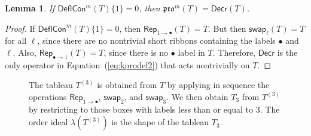 \documentclass[12pt]{amsart}
\newtheorem{lemma}[theorem]{Lemma}
\theoremstyle{definition}
\theoremstyle{remark}
\numberwithin{equation}{section}
\newcommand{\pro}{\mathfrak{pro}}
\newcommand{\swap}{\ensuremath{\mathsf{swap}}}
\newcommand{\decr}{\ensuremath{\mathsf{Decr}}}
\newcommand{\rep}{\ensuremath{\mathsf{Rep}}}
\newcommand{\compress}{\ensuremath{\mathsf{DeflCon}}}
\begin{document}
\begin{lemma}\label{lem:no_ones}
If $\compress^m(T)\lbrace 1 \rbrace = 0$, then $\pro^m(T) = \decr(T)$. 
\end{lemma} 
\begin{proof}
If $\compress^m(T)\lbrace 1 \rbrace = 0$, then $\rep_{1 \rightarrow \bullet}(T) = T$. But then $\swap_\ell(T) = T$ for all $\ell$, since there are no nontrivial short ribbons containing the labels $\bullet$ and $\ell$. Also, $\rep_{\bullet \rightarrow 1}(T) = T$, since there is no $\bullet$ label in $T$. Therefore, $\decr$ is the only operator in Equation~(\ref{eq:kprodef2}) that acts nontrivially on $T$. 
\end{proof}

\begin{figure}[h]
\caption{The tableau $T^{(3)}$ is obtained from $T$ by applying in sequence the operations 
$\rep_{1 \rightarrow \bullet}$, $\swap_2$, and $\swap_3$. 
We then obtain $T_3$ from $T^{(3)}$ by restricting to 
those boxes with labels less than or equal to $3$. The order ideal
 $\lambda \left( T^{(3)} \right)$ is the 
shape of the tableau $T_3$. }\label{fig:restricted_promotions}
\end{figure}
\end{document}
